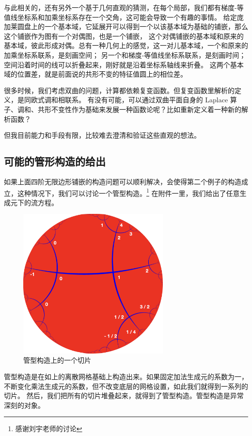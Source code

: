 \documentclass[a4paper,12pt]{article}
\numberwithin{problem}{section}
\numberwithin{definition}{section}
\numberwithin{lemma}{section}
\numberwithin{proposition}{section}
\numberwithin{theorem}{section}
\numberwithin{grammar}{section}
\numberwithin{program}{section}
\numberwithin{convention}{section}
\numberwithin{corollary}{section}
\begin{document}
与此相关的，还有另外一个基于几何直观的猜测，在每个局部，我们都有梯度-等值线坐标系和加乘坐标系存在一个交角，这可能会导致一个有趣的事情。
给定庞加莱圆盘上的一个基本域，它延展开可以得到一个以该基本域为基础的铺嵌，那么这个铺嵌作为图有一个对偶图，也是一个铺嵌，
这个对偶铺嵌的基本域和原来的基本域，彼此形成对偶。总有一种几何上的感觉，这一对儿基本域，一个和原来的加乘坐标系联系，是刻画空间；
另一个和梯度-等值线坐标系联系，是刻画时间；空间沿着时间的线可以折叠起来，刚好就是沿着坐标系轴线来折叠。
这两个基本域的位置差，就是前面说的共形不变的特征值圆上的相位差。

很多时候，我们考虑双曲的问题，计算都依赖复变函数。但复变函数里解析的定义，是同欧式调和相联系。
有没有可能，可以通过双曲平面自身的 Laplace 算子、调和、共形不变性作为基础来发展一种函数论呢？比如重新定义着一种新的解析函数？

但我目前能力和手段有限，比较难去澄清和验证这些直观的想法。

\subsection{可能的管形构造的给出}

如果上面四阶无限边形铺嵌的构造问题可以顺利解决，会使得第二个例子的构造成立，这种情况下，我们可以讨论一个管型构造。\footnote{感谢刘宇老师的讨论}
在附件一里，我们给出了任意生成元下的流方程。

\begin{figure}[ht]
\centering
\includegraphics[width=3in]{images/assignment2.png}
\caption{管型构造上的一个切片}
\end{figure}

管型构造是在如上的离散网格基础上构造出来。如果固定加法生成元的系数为一，不断变化乘法生成元的系数，但不改变底层的网格设置，如此我们就得到一系列的切片。
然后，我们把所有的切片堆叠起来，就得到了管型构造。管型构造是异常深刻的对象。
\end{document}
